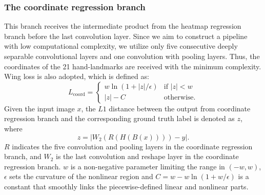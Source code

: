 \documentclass[11pt]{article}
\begin{document}
\subsubsection{The coordinate regression branch}
This branch receives the intermediate product from the heatmap regression branch before the last convolution layer. Since we aim to construct a pipeline with low computational complexity, we utilize only five consecutive deeply separable convolutional layers and one convolution with pooling layers. Thus, the coordinates of the 21 hand-landmarks are received with the minimum complexity. Wing loss \cite{ref40} is also adopted, which is defined as:
\begin{equation}
L_{\text{coord}} =
\begin{cases}
w \ln (1 + |z|/\epsilon) & \text{if } |z| < w\\
|z| - C & \text{otherwise}.
\end{cases}
\tag{2}
\end{equation}
Given the input image $x$, the $L1$ distance between the output from coordinate regression branch and the corresponding ground truth label is denoted as $z$, where
\[
z = \left|W_{2}\!\left(R(H(B(x)))\right) - y\right|.
\]
$R$ indicates the five convolution and pooling layers in the coordinate regression branch, and $W_{2}$ is the last convolution and reshape layer in the coordinate regression branch. $w$ is a non-negative parameter limiting the range in $(-w, w)$, $\epsilon$ sets the curvature of the nonlinear region and $C = w-w \ln(1+w/\epsilon)$ is a constant that smoothly links the piecewise-defined linear and nonlinear parts.
\end{document}
